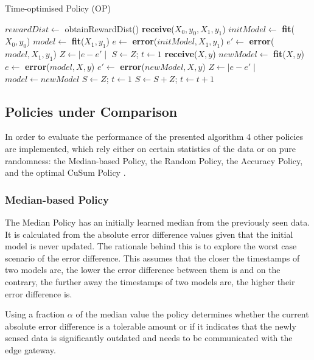 \documentclass{mpaper}
\begin{document}
\begin{algorithm}
\caption{Time-optimised Policy (OP)}\label{polOP}
\begin{algorithmic}
\State $rewardDist \gets$ obtainRewardDist() 
\State \textbf{receive}($X_0, y_0, X_1, y_1$)
\State $initModel \gets$ \textbf{fit}($X_0, y_0$)
\State $model \gets$ \textbf{fit}($X_1, y_1$)
\State $e \gets$ \textbf{error}($initModel,X_1,y_1$)
\State $e' \gets$ \textbf{error}($model,X_1,y_1$)
\State $Z \gets \mid e - e' \mid$
\State $S \gets Z$; $t \gets 1$
    \State \textbf{receive}($X, y$)
    \State $newModel \gets$ \textbf{fit}($X,y$)
    \State $e \gets$ \textbf{error}($model,X,y$)
    \State $e' \gets$ \textbf{error}($newModel,X,y$)
    \State $Z \gets \mid e - e' \mid$
        \State $model \gets newModel$ 
        \State $S \gets Z$; $t \gets 1$
    \Else
        \State $S \gets S + Z$; $t \gets t + 1$
    \EndIf
\EndWhile
\end{algorithmic}
\end{algorithm}
\newpage
\subsection{Policies under Comparison}
In order to evaluate the performance of the presented algorithm 4 other policies are implemented, which rely either on certain statistics of the data or on pure randomness: the Median-based Policy, the Random Policy, the Accuracy Policy, and the optimal CuSum Policy \cite{cusum_pierre}.

\subsubsection{Median-based Policy}
The Median Policy has an initially learned median from the previously seen data. It is calculated from the absolute error difference values given that the initial model is never updated. 
The rationale behind this is to explore the worst case scenario of the error difference. This assumes that the closer the timestamps of two models are, the lower the error difference between them is and on the contrary, the further away the timestamps of two models are, the higher their error difference is.

Using a fraction $\alpha$ of the median value the policy determines whether the current absolute error difference is a tolerable amount or if it indicates that the newly sensed data is significantly outdated and needs to be communicated with the edge gateway.
\end{document}
